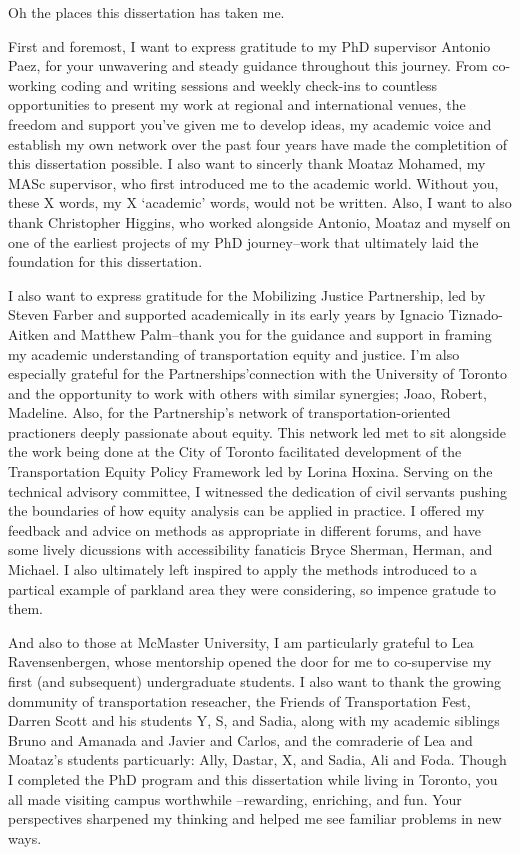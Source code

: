 \documentclass[
11pt, %
oneside, %
english, %
singlespacing, %
]{macthesis} %
\begin{document}
  \begin{acknowledgements}
  \addchaptertocentry{\acknowledgementname} %
    Oh the places this dissertation has taken me.

    First and foremost, I want to express gratitude to my PhD supervisor Antonio Paez, for your unwavering and steady guidance throughout this journey. From co-working coding and writing sessions and weekly check-ins to countless opportunities to present my work at regional and international venues, the freedom and support you've given me to develop ideas, my academic voice and establish my own network over the past four years have made the completition of this dissertation possible. I also want to sincerly thank Moataz Mohamed, my MASc supervisor, who first introduced me to the academic world. Without you, these X words, my X `academic' words, would not be written. Also, I want to also thank Christopher Higgins, who worked alongside Antonio, Moataz and myself on one of the earliest projects of my PhD journey--work that ultimately laid the foundation for this dissertation.

    I also want to express gratitude for the Mobilizing Justice Partnership, led by Steven Farber and supported academically in its early years by Ignacio Tiznado-Aitken and Matthew Palm--thank you for the guidance and support in framing my academic understanding of transportation equity and justice. I'm also especially grateful for the Partnerships'connection with the University of Toronto and the opportunity to work with others with similar synergies; Joao, Robert, Madeline. Also, for the Partnership's network of transportation-oriented practioners deeply passionate about equity. This network led met to sit alongside the work being done at the City of Toronto facilitated development of the Transportation Equity Policy Framework led by Lorina Hoxina. Serving on the technical advisory committee, I witnessed the dedication of civil servants pushing the boundaries of how equity analysis can be applied in practice. I offered my feedback and advice on methods as appropriate in different forums, and have some lively dicussions with accessibility fanaticis Bryce Sherman, Herman, and Michael. I also ultimately left inspired to apply the methods introduced to a partical example of parkland area they were considering, so impence gratude to them.

    And also to those at McMaster University, I am particularly grateful to Lea Ravensenbergen, whose mentorship opened the door for me to co-supervise my first (and subsequent) undergraduate students. I also want to thank the growing dommunity of transportation reseacher, the Friends of Transportation Fest, Darren Scott and his students Y, S, and Sadia, along with my academic siblings Bruno and Amanada and Javier and Carlos, and the comraderie of Lea and Moataz's students particuarly: Ally, Dastar, X, and Sadia, Ali and Foda. Though I completed the PhD program and this dissertation while living in Toronto, you all made visiting campus worthwhile --rewarding, enriching, and fun. Your perspectives sharpened my thinking and helped me see familiar problems in new ways.


\end{acknowledgements}
\end{document}
